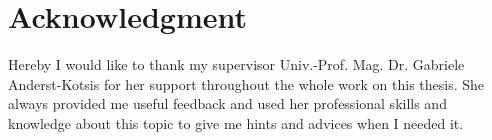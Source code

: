 \chapter*{Acknowledgment}

Hereby I would like to thank my supervisor Univ.-Prof. Mag. Dr. Gabriele Anderst-Kotsis for her support throughout the whole work on this thesis. She always provided me useful feedback and used her professional skills and knowledge about this topic to give me hints and advices when I needed it.
\fi

